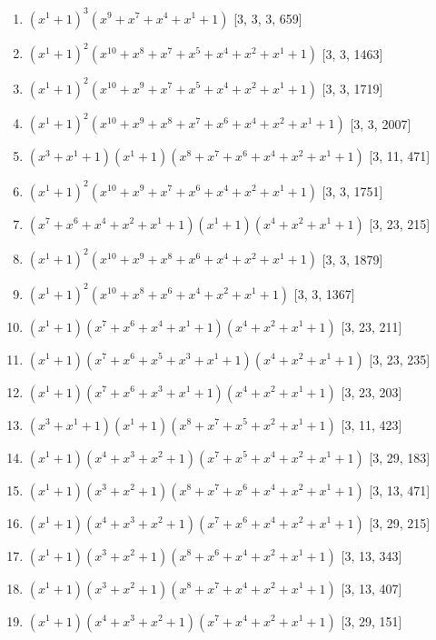 \documentclass[10pt,twocolumn]{article}
\begin{document}
\begin{enumerate}
\item $(x^{1} + 1)^{3}(x^{9} + x^{7} + x^{4} + x^{1} + 1)$  [3, 3, 3, 659]
\item $(x^{1} + 1)^{2}(x^{10} + x^{8} + x^{7} + x^{5} + x^{4} + x^{2} + x^{1} + 1)$  [3, 3, 1463]
\item $(x^{1} + 1)^{2}(x^{10} + x^{9} + x^{7} + x^{5} + x^{4} + x^{2} + x^{1} + 1)$  [3, 3, 1719]
\item $(x^{1} + 1)^{2}(x^{10} + x^{9} + x^{8} + x^{7} + x^{6} + x^{4} + x^{2} + x^{1} + 1)$  [3, 3, 2007]
\item $(x^{3} + x^{1} + 1)(x^{1} + 1)(x^{8} + x^{7} + x^{6} + x^{4} + x^{2} + x^{1} + 1)$  [3, 11, 471]
\item $(x^{1} + 1)^{2}(x^{10} + x^{9} + x^{7} + x^{6} + x^{4} + x^{2} + x^{1} + 1)$  [3, 3, 1751]
\item $(x^{7} + x^{6} + x^{4} + x^{2} + x^{1} + 1)(x^{1} + 1)(x^{4} + x^{2} + x^{1} + 1)$  [3, 23, 215]
\item $(x^{1} + 1)^{2}(x^{10} + x^{9} + x^{8} + x^{6} + x^{4} + x^{2} + x^{1} + 1)$  [3, 3, 1879]
\item $(x^{1} + 1)^{2}(x^{10} + x^{8} + x^{6} + x^{4} + x^{2} + x^{1} + 1)$  [3, 3, 1367]
\item $(x^{1} + 1)(x^{7} + x^{6} + x^{4} + x^{1} + 1)(x^{4} + x^{2} + x^{1} + 1)$  [3, 23, 211]
\item $(x^{1} + 1)(x^{7} + x^{6} + x^{5} + x^{3} + x^{1} + 1)(x^{4} + x^{2} + x^{1} + 1)$  [3, 23, 235]
\item $(x^{1} + 1)(x^{7} + x^{6} + x^{3} + x^{1} + 1)(x^{4} + x^{2} + x^{1} + 1)$  [3, 23, 203]
\item $(x^{3} + x^{1} + 1)(x^{1} + 1)(x^{8} + x^{7} + x^{5} + x^{2} + x^{1} + 1)$  [3, 11, 423]
\item $(x^{1} + 1)(x^{4} + x^{3} + x^{2} + 1)(x^{7} + x^{5} + x^{4} + x^{2} + x^{1} + 1)$  [3, 29, 183]
\item $(x^{1} + 1)(x^{3} + x^{2} + 1)(x^{8} + x^{7} + x^{6} + x^{4} + x^{2} + x^{1} + 1)$  [3, 13, 471]
\item $(x^{1} + 1)(x^{4} + x^{3} + x^{2} + 1)(x^{7} + x^{6} + x^{4} + x^{2} + x^{1} + 1)$  [3, 29, 215]
\item $(x^{1} + 1)(x^{3} + x^{2} + 1)(x^{8} + x^{6} + x^{4} + x^{2} + x^{1} + 1)$  [3, 13, 343]
\item $(x^{1} + 1)(x^{3} + x^{2} + 1)(x^{8} + x^{7} + x^{4} + x^{2} + x^{1} + 1)$  [3, 13, 407]
\item $(x^{1} + 1)(x^{4} + x^{3} + x^{2} + 1)(x^{7} + x^{4} + x^{2} + x^{1} + 1)$  [3, 29, 151]

\end{enumerate}
\end{document}
